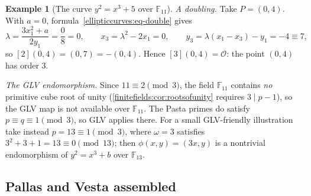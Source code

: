 \documentclass[11pt,a4paper]{article}
\theoremstyle{definition}
\newtheorem{example}[theorem]{Example}
\theoremstyle{remark}
\newcommand{\F}{\ensuremath{\mathbb{F}}}
\begin{document}
\begin{example}[The curve \(y^2 = x^3 + 5\) over \(\F_{11}\)]
\smallskip
\emph{A doubling.} Take \(P = (0, 4)\). With \(a = 0\),
formula~\eqref{ellipticcurves:eq-double} gives
\[
  \lambda = \frac{3 x_1^2 + a}{2 y_1} = \frac{0}{8} = 0, \qquad
  x_3 = \lambda^2 - 2 x_1 = 0, \qquad
  y_3 = \lambda(x_1 - x_3) - y_1 = -4 \equiv 7 ,
\]
so \([2](0, 4) = (0, 7) = -(0, 4)\). Hence
\([3](0, 4) = \mathcal{O}\): the point \((0, 4)\) has order \(3\).

\smallskip
\emph{The GLV endomorphism.} Since \(11 \equiv 2 \pmod 3\), the field
\(\F_{11}\) contains \emph{no} primitive cube root of unity
(\cref{finitefields:cor:rootsofunity} requires \(3 \mid p - 1\)), so
the GLV map is not available over \(\F_{11}\). The Pasta primes do
satisfy \(p \equiv q \equiv 1 \pmod 3\), so GLV applies there. For a
small GLV-friendly illustration take instead
\(p = 13 \equiv 1 \pmod 3\), where \(\omega = 3\) satisfies
\(3^2 + 3 + 1 = 13 \equiv 0 \pmod{13}\); then
\(\phi(x, y) = (3x, y)\) is a nontrivial endomorphism of
\(y^2 = x^3 + b\) over \(\F_{13}\).
\end{example}

\subsection{Pallas and Vesta assembled}\label{ellipticcurves:subsec-pasta}
\end{document}

